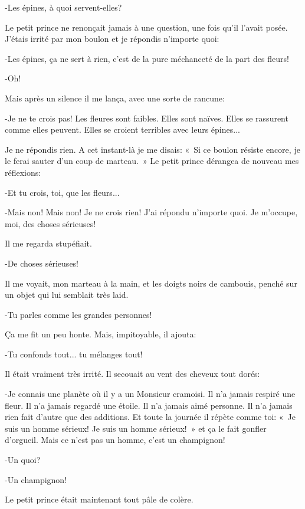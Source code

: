 \documentclass{report}
\begin{document}
-Les épines, à quoi servent-elles?

Le petit prince ne renonçait jamais à une question, une fois qu'il l'avait posée. J'étais irrité par mon boulon et je répondis n'importe quoi:

-Les épines, ça ne sert à rien, c'est de la pure méchanceté de la part des fleurs!

-Oh!

Mais après un silence il me lança, avec une sorte de rancune:

-Je ne te crois pas! Les fleures sont faibles. Elles sont naïves. Elles se rassurent comme elles peuvent. Elles se croient terribles avec leurs épines...

Je ne répondis rien. A cet instant-là je me disais: «~Si ce boulon résiste encore, je le ferai sauter d'un coup de marteau.~» Le petit prince dérangea de nouveau mes réflexions:

-Et tu crois, toi, que les fleurs...

-Mais non! Mais non! Je ne crois rien! J'ai répondu n'importe quoi. Je m'occupe, moi, des choses sérieuses!

Il me regarda stupéfiait.

-De choses sérieuses!

Il me voyait, mon marteau à la main, et les doigts noirs de cambouis, penché sur un objet qui lui semblait très laid.

-Tu parles comme les grandes personnes!

Ça me fit un peu honte. Mais, impitoyable, il ajouta:

-Tu confonds tout... tu mélanges tout!

Il était vraiment très irrité. Il secouait au vent des cheveux tout dorés:

-Je connais une planète où il y a un Monsieur cramoisi. Il n'a jamais respiré une fleur. Il n'a jamais regardé une étoile. Il n'a jamais aimé personne. Il n'a jamais rien fait d'autre que des additions. Et toute la journée il répète comme toi: «~Je suis un homme sérieux! Je suis un homme sérieux!~» et ça le fait gonfler d'orgueil. Mais ce n'est pas un homme, c'est un champignon! 


-Un quoi?

-Un champignon!

Le petit prince était maintenant tout pâle de colère.
\end{document}
